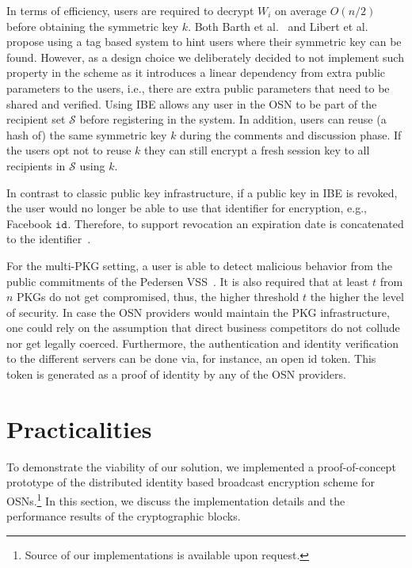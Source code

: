 \documentclass{llncs}
\newcommand{\id}[1]{\ensuremath{\mathtt{id}_{#1}}}
\begin{document}
In terms of efficiency, users are required to decrypt $W_i$ on average $O\left( n/2 \right)$ before obtaining the symmetric key $k$. Both Barth et al.~\cite{BarthBonehWaters} and Libert et al.~\cite{LibertANOBE} propose using a tag based system to hint users where their symmetric key can be found. However, as a design choice we deliberately decided to not implement such property in the scheme as it introduces a linear dependency from extra public parameters to the users, i.e., there are extra public parameters that need to be shared and verified. Using IBE allows any user in the OSN to be part of the recipient set $\mathcal{S}$ before registering in the system. In addition, users can reuse (a hash of) the same symmetric key $k$ during the comments and discussion phase. If the users opt not to reuse $k$ they can still encrypt a fresh session key to all recipients in $\mathcal{S}$ using $k$.

In contrast to classic public key infrastructure, if a public key in IBE is revoked, the user would no longer be able to use that identifier for encryption, e.g., Facebook \id{}. Therefore, to support revocation an expiration date is concatenated to the identifier~\cite{BonehFranklinIBE}. 

For the multi-PKG setting, a user is able to detect malicious behavior from the public commitments of the Pedersen VSS~\cite{Pedersen:1991:NIS:646756.705507}. It is also required that at least $t$ from $n$ PKGs do not get compromised, thus, the higher threshold $t$ the higher the level of security. In case the OSN providers would maintain the PKG infrastructure, one could rely on the assumption that direct business competitors do not collude nor get legally coerced. Furthermore, the authentication and identity verification to the different servers can be done via, for instance, an open id token. This token is generated as a proof of identity by any of the OSN providers.


\section{Practicalities}\label{sec:impl}
To demonstrate the viability of our solution, we implemented a proof-of-concept prototype of the distributed identity based broadcast encryption scheme for OSNs.\footnote{Source of our implementations is available upon request.} In this section, we discuss the implementation details and the performance results of the cryptographic blocks.
\end{document}
